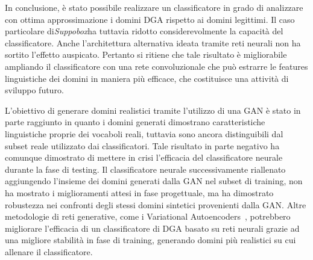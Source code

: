 In conclusione, è stato possibile realizzare un classificatore in grado di analizzare con ottima approssimazione i domini DGA rispetto ai domini legittimi. Il caso particolare di\textit{Suppobox}ha tuttavia ridotto considerevolmente la capacità del classificatore. Anche l'architettura alternativa ideata tramite reti neurali non ha sortito l'effetto auspicato. Pertanto si ritiene che tale risultato è migliorabile ampliando il classificatore con una rete convoluzionale che può estrarre le features linguistiche dei domini in maniera più efficace, che costituisce una attività di sviluppo futuro.

L'obiettivo di generare domini realistici tramite l'utilizzo di una GAN è stato in parte raggiunto in quanto i domini generati dimostrano caratteristiche linguistiche proprie dei vocaboli reali, tuttavia sono ancora distinguibili dal subset reale utilizzato dai classificatori. Tale risultato in parte negativo ha comunque dimostrato di mettere in crisi l'efficacia del classificatore neurale durante la fase di testing. Il classificatore neurale successivamente riallenato aggiungendo l'insieme dei domini generati dalla GAN nel subset di training, non ha mostrato i miglioramenti attesi in fase progettuale, ma ha dimostrato robustezza nei confronti degli stessi domini sintetici provenienti dalla GAN. Altre metodologie di reti generative, come i Variational Autoencoders~\cite{VAE}, potrebbero migliorare l'efficacia di un classificatore di DGA basato su reti neurali grazie ad una migliore stabilità in fase di training, generando domini più realistici su cui allenare il classificatore.



